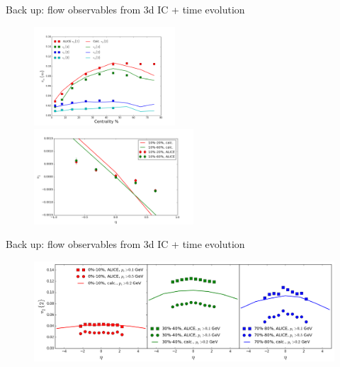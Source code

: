 \documentclass[11pt]{beamer}
\begin{document}
\begin{frame}[noframenumbering]{Back up: flow observables from 3d IC + time evolution}
\begin{figure}
\begin{center}
\includegraphics[width = 0.47\textwidth]{./pics/vmn-PbPb.png}
\includegraphics[width = 0.53\textwidth]{./pics/v1-PbPb.png}
\end{center}
\end{figure}
\end{frame}

\begin{frame}[noframenumbering]{Back up: flow observables from 3d IC + time evolution}
\begin{figure}
\begin{center}
\includegraphics[width = \textwidth]{./pics/v2-eta-PbPb.png}
\end{center}
\end{figure}
\end{frame}
\end{document}
